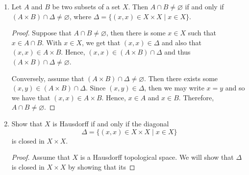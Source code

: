 \documentclass[12pt]{article}
\theoremstyle{definition}
\begin{document}
\begin{enumerate}
\begin{enumerate}
            \item $\bigcup_{\alpha\in J}\overline{A}_{\alpha}\subset\overline{\bigcup_{\alpha\in J}A_{\alpha}}$.
                \begin{proof}
                    Let $\alpha_0\in J$ be any fixed element. Then 
                    $A_{\alpha_0}\subset\bigcup_{\alpha\in J}A_{\alpha}$. Hence, 
                    by (a), $\overline{A}_{\alpha_0}\subset\overline{\bigcup_{\alpha\in J}A_{\alpha}}$. 
                    Since this choice of $\alpha_0$ was arbitrary, then the 
                    containment hold for all such $\alpha\in J$. Hence, 
                    $\bigcup_{\alpha\in J}\overline{A}_{\alpha}\subset
                    \overline{\bigcup_{\alpha\in J}A_{\alpha\in J}}$.
                \end{proof}
        \end{enumerate}
        \item Let $A$ and  $B$ be two subsets of a set $X$. Then $A\cap B\neq\varnothing$
        if and only if $(A\times B)\cap \Delta\neq \varnothing$, where
        $\Delta=\{(x, x)\in X\times X\mid x\in X\}$.
        \begin{proof}
            Suppose that $A\cap B\neq\varnothing$, then there is some $x\in
            X$ such that $x\in A\cap B$. With $x\in X$, we get that $(x,
            x)\in \Delta$ and also that $(x, x)\in A\times B$. Hence, $(x,
            x)\in (A\times B)\cap\Delta$ and thus $(A\times
            B)\cap\Delta\neq\varnothing$.\par\hspace{4mm} Conversely,
            assume that $(A\times B)\cap\Delta\neq\varnothing$. Then there
            exists some $(x, y)\in (A\times B)\cap\Delta$. Since $(x,
            y)\in\Delta$, then we may write $x=y$ and so we have that $(x,
            x)\in A\times B$. Hence, $x\in A$ and $x\in B$. Therefore,
            $A\cap B\neq\varnothing$.
        \end{proof}
        \item Show that $X$ is Hausdorff if and only if the diagonal
            \begin{equation*}
                \Delta=\{(x, x)\in X\times X\mid x\in X\}
            \end{equation*}
            is closed in $X\times X$.
            \begin{proof}
                Assume that $X$ is a Hausdorff topological space. We will show
                that $\Delta$ is closed in $X\times X$ by showing that its

\end{proof}
\end{enumerate}
\end{document}
